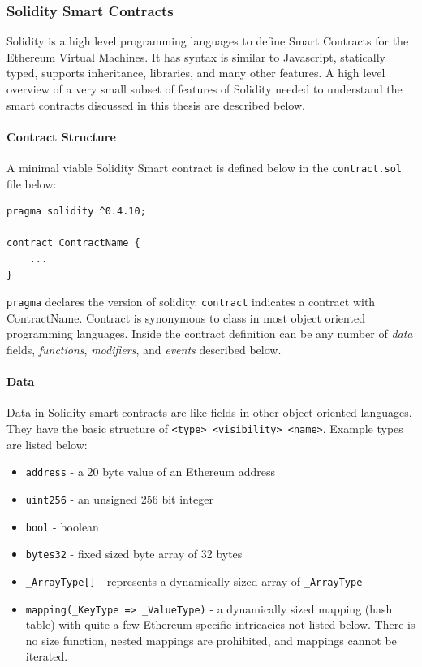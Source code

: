 \documentclass[a4paper,12pt]{article} %
\def\code#1{\texttt{#1}}
\begin{document}
\subsubsection{Solidity Smart Contracts} \label{sssec:2:ethereum:soliditySmartContracts}

Solidity is a high level programming languages to define Smart Contracts for the Ethereum Virtual Machines\cite{solidity}. It has syntax is similar to Javascript, statically typed, supports inheritance, libraries, and many other features. A high level overview of a very small subset of features of Solidity needed to understand the smart contracts discussed in this thesis are described below.

\paragraph*{Contract Structure}

A minimal viable Solidity Smart contract is defined below in the \code{contract.sol} file below:

\begin{lstlisting}
pragma solidity ^0.4.10;

contract ContractName {
	...
}
\end{lstlisting}

\code{pragma} declares the version of solidity. \code{contract} indicates a contract with ContractName. Contract is synonymous to class in most object oriented programming languages. Inside the contract definition can be any number of \textit{data} fields, \textit{functions}, \textit{modifiers}, and \textit{events} described below.

\paragraph*{Data}

Data in Solidity smart contracts are like fields in other object oriented languages. They have the basic structure of \code{<type> <visibility> <name>}. Example types are listed below:

\begin{itemize}
	\item \code{address} - a 20 byte value of an Ethereum address
	\item \code{uint256} - an unsigned 256 bit integer
	\item \code{bool} - boolean
	\item \code{bytes32} - fixed sized byte array of 32 bytes
	\item \code{\_ArrayType[]} - represents a dynamically sized array of \code{\_ArrayType}
	\item \code{mapping(\_KeyType => \_ValueType)} - a dynamically sized mapping (hash table) with quite a few Ethereum specific intricacies not listed below. There is no size function, nested mappings are prohibited, and mappings cannot be iterated.
\end{itemize}
\end{document}
